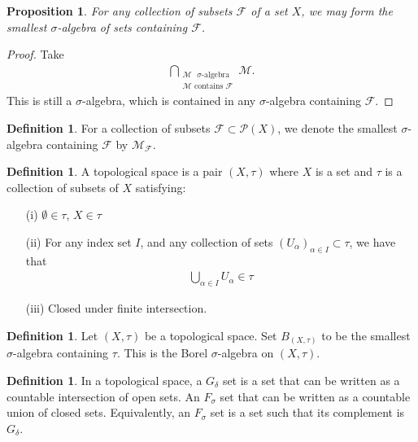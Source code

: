 \documentclass[11pt]{amsart}
\newtheorem{proposition}[theorem]{Proposition}
\theoremstyle{definition}
\newtheorem{definition}[theorem]{Definition}
\numberwithin{equation}{section}
\begin{document}
\begin{proposition}
    For any collection of subsets $\mathcal F$ of a set $X$, we may form the smallest $\sigma$-algebra of sets containing $\mathcal F$.
\end{proposition}
\begin{proof}
    Take 
    \begin{align*}
        \bigcap_{\substack{\mathcal M\text{ }\sigma\text{-algebra}\\
        \mathcal M\text{ contains }\mathcal F}}\mathcal M.
    \end{align*}
    This is still a $\sigma$-algebra, which is contained in any $\sigma$-algebra containing $\mathcal F$.
\end{proof}
\begin{definition}
    For a collection of subsets $\mathcal F\subset\mathcal P(X)$, we denote the smallest $\sigma$-algebra containing $\mathcal F$ by $\mathcal M_\mathcal F$.
\end{definition}
    
\begin{definition}
    A topological space is a pair $(X,\tau)$ where $X$ is a set and $\tau$ is a collection of subsets of $X$ satisfying:
    \begin{enumerate}
        \item [(i)] $\emptyset\in\tau$, $X\in\tau$
        \item [(ii)] For any index set $I$, and any collection of sets $(U_\alpha)_{\alpha\in I}\subset \tau$, we have that
        \begin{align*}
            \bigcup_{\alpha\in I}U_\alpha\in\tau
        \end{align*}
        \item [(iii)] Closed under finite intersection.
    \end{enumerate}
\end{definition}
\begin{definition}
    Let $(X,\tau)$ be a topological space. Set $B_{(X,\tau)}$ to be the smallest $\sigma$-algebra containing $\tau$. This is the Borel $\sigma$-algebra on $(X,\tau)$.
\end{definition}
\begin{definition}
    In a topological space, a $G_\delta$ set is a set that can be written as a countable intersection of open sets. An $F_\sigma$ set that can be written as a countable union of closed sets. Equivalently, an $F_\sigma$ set is a set such that its complement is $G_\delta$.
\end{definition}
\end{document}
